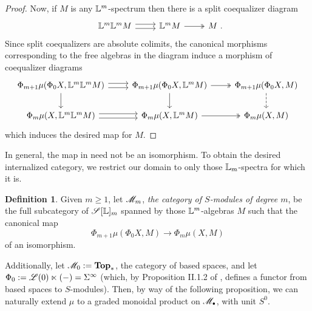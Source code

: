 \documentclass[openany, amssymb, psamsfonts]{amsart}
\theoremstyle{definition}
\newtheorem{defn}{Definition}[section]
\numberwithin{equation}{section}
\begin{document}
\begin{proof}
    Now, if $M$ is any $\mathbb{L}^m$-spectrum then there is a split coequalizer diagram
    \begin{equation*}
        \begin{tikzcd}
            \LL^m \LL^m M \ar[r, shift left = 0.25em] \ar[r, shift right = 0.25em] & \LL^m M \ar[r, two heads] & M \period
        \end{tikzcd}
    \end{equation*} Since split coequalizers are absolute colimits, the canonical morphisms corresponding to the free algebras in the diagram induce a morphism of coequalizer diagrams
    \begin{equation*}
        \begin{tikzcd}
            \Phi_{m + 1}\mu(\Phi_0 X, \LL^m \LL^m M) \ar[r, shift left = 0.25em] \ar[r, shift right = 0.25em] \ar[d] & \Phi_{m + 1}\mu(\Phi_0 X, \LL^m M) \ar[r, two heads] \ar[d] & \Phi_{m + 1}\mu(\Phi_0 X, M) \ar[d, dashed]\\
            \Phi_m\mu(X, \LL^m \LL^m M) \ar[r, shift left = 0.25em] \ar[r, shift right = 0.25em] & \Phi_m\mu(X, \LL^m M) \ar[r, two heads] & \Phi_m\mu(X, M)
        \end{tikzcd}
    \end{equation*}
    which induces the desired map for $M$.
\end{proof}

In general, the map in  need not be an isomorphism. To obtain the desired internalized category, we restrict our domain to only those $\mathbb{L}_m$-spectra for which it is.

\begin{defn}\label{def:graded_Smodule}
    Given $m \geq 1$, let $\mathscr{M}_m$, \emph{the category of $S$-modules of degree $m$}, be the full subcategory of $\mathscr{S}[\mathbb{L}]_m$ spanned by those $\mathbb{L}^m$-algebras $M$ such that the canonical map
    \begin{equation*}
        \Phi_{m+1}\mu(\Phi_0 X, M) \to \Phi_m\mu(X, M)
    \end{equation*} of  an isomorphism.

    Additionally, let $\mathscr{M}_0 := \textbf{\textup{Top}}_*$, the category of based spaces, and let $\Phi_0 := \mathscr{L}(0) \ltimes (-) = \Sigma^\infty$ (which, by Proposition II.1.2 of \cite{EKMM}, defines a functor from based spaces to $S$-modules). Then, by way of the following proposition, we can naturally extend $\mu$ to a graded monoidal product on $\scM_\sbull$, with unit $S^0$.
\end{defn}
\end{document}
